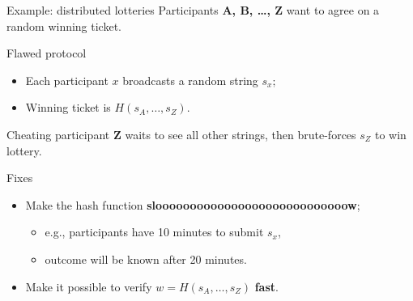 \documentclass[aspectratio=169]{beamer}
\begin{document}
\begin{frame}{Example: distributed lotteries}
  Participants \textbf{A, B, \dots, Z} want to agree on a random
  winning ticket.

  \begin{block}{Flawed protocol}
    \begin{itemize}
    \item Each participant \emph{$x$} broadcasts a random string
      \emph{$s_x$};
    \item Winning ticket is \emph{$H(s_A, \dots, s_Z)$}.
    \end{itemize}

    \pause
    
    Cheating participant \textbf{Z} waits to see all other strings,
    then brute-forces \emph{$s_Z$} to win lottery.
  \end{block}
  
  \pause

  \begin{block}{Fixes}
    \begin{itemize}
    \item Make the hash function \textbf{sloooooooooooooooooooooooooooow};
      \begin{itemize}
      \item e.g., participants have 10 minutes to submit $s_x$,
      \item outcome will be known after 20 minutes.
      \end{itemize}
    \item<4-> Make it possible to verify \emph{$w = H(s_A, \dots, s_Z)$} \textbf{fast}.
    \end{itemize}
  \end{block}
\end{frame}

\end{document}
